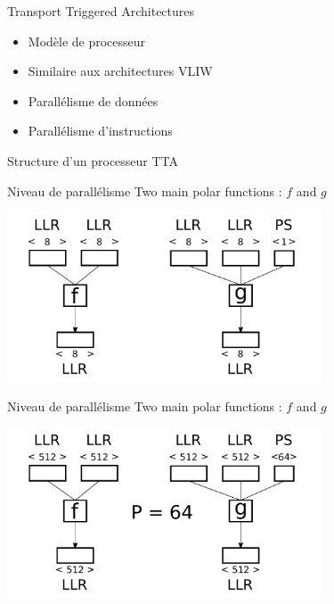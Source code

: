 \documentclass[t,compress,mathserif,12pt,xcolor=dvipsnames]{beamer}
\begin{document}
\begin{frame}[c]{Transport Triggered Architectures}
	\begin{itemize}
		\item Modèle de processeur
		\vspace{0.5cm}
		\item Similaire aux architectures VLIW
		\vspace{0.5cm}
		\item Parallélisme de données
		\vspace{0.5cm}
		\item Parallélisme d'instructions
	\end{itemize}
\end{frame}

\begin{frame}[c]{Structure d'un processeur TTA}
\end{frame}

\begin{frame}[c]{Niveau de parallélisme}
	Two main polar functions : $f$ and $g$
	\vspace{1cm}

	\includegraphics[width=0.7\textwidth]{fig/f_g_dimensions_scalar}
\end{frame}

\begin{frame}[c]{Niveau de parallélisme}
	Two main polar functions : $f$ and $g$
	\vspace{1cm}

	\includegraphics[width=0.7\textwidth]{fig/f_g_dimensions_vector}
\end{frame}
\end{document}
